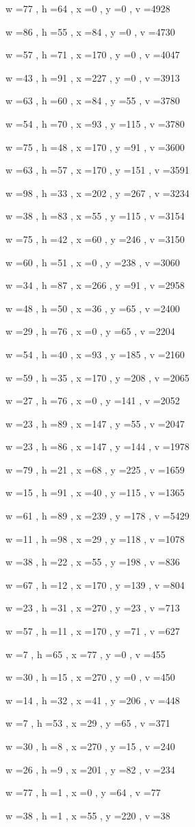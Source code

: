\documentclass[11pt]{article}
\begin{document}
w =77 , h =64 , x =0 , y =0 , v =4928
\par
w =86 , h =55 , x =84 , y =0 , v =4730
\par
w =57 , h =71 , x =170 , y =0 , v =4047
\par
w =43 , h =91 , x =227 , y =0 , v =3913
\par
w =63 , h =60 , x =84 , y =55 , v =3780
\par
w =54 , h =70 , x =93 , y =115 , v =3780
\par
w =75 , h =48 , x =170 , y =91 , v =3600
\par
w =63 , h =57 , x =170 , y =151 , v =3591
\par
w =98 , h =33 , x =202 , y =267 , v =3234
\par
w =38 , h =83 , x =55 , y =115 , v =3154
\par
w =75 , h =42 , x =60 , y =246 , v =3150
\par
w =60 , h =51 , x =0 , y =238 , v =3060
\par
w =34 , h =87 , x =266 , y =91 , v =2958
\par
w =48 , h =50 , x =36 , y =65 , v =2400
\par
w =29 , h =76 , x =0 , y =65 , v =2204
\par
w =54 , h =40 , x =93 , y =185 , v =2160
\par
w =59 , h =35 , x =170 , y =208 , v =2065
\par
w =27 , h =76 , x =0 , y =141 , v =2052
\par
w =23 , h =89 , x =147 , y =55 , v =2047
\par
w =23 , h =86 , x =147 , y =144 , v =1978
\par
w =79 , h =21 , x =68 , y =225 , v =1659
\par
w =15 , h =91 , x =40 , y =115 , v =1365
\par
w =61 , h =89 , x =239 , y =178 , v =5429
\par
w =11 , h =98 , x =29 , y =118 , v =1078
\par
w =38 , h =22 , x =55 , y =198 , v =836
\par
w =67 , h =12 , x =170 , y =139 , v =804
\par
w =23 , h =31 , x =270 , y =23 , v =713
\par
w =57 , h =11 , x =170 , y =71 , v =627
\par
w =7 , h =65 , x =77 , y =0 , v =455
\par
w =30 , h =15 , x =270 , y =0 , v =450
\par
w =14 , h =32 , x =41 , y =206 , v =448
\par
w =7 , h =53 , x =29 , y =65 , v =371
\par
w =30 , h =8 , x =270 , y =15 , v =240
\par
w =26 , h =9 , x =201 , y =82 , v =234
\par
w =77 , h =1 , x =0 , y =64 , v =77
\par
w =38 , h =1 , x =55 , y =220 , v =38
\par
\newpage
\end{document}
